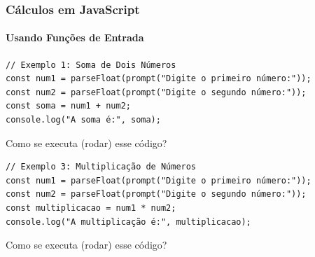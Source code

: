 \documentclass[13pt, xcolor={dvipsnames,svgnames}, portuguese]{beamer}
\begin{document}
\begin{frame}[fragile]
\frametitle{Cálculos em JavaScript}
\framesubtitle{Usando Funções de Entrada}

\begin{verbatim}
// Exemplo 1: Soma de Dois Números
const num1 = parseFloat(prompt("Digite o primeiro número:"));
const num2 = parseFloat(prompt("Digite o segundo número:"));
const soma = num1 + num2;
console.log("A soma é:", soma);
\end{verbatim}
Como se executa (rodar) esse código?
\end{frame}
\begin{frame}[fragile]

\begin{verbatim}
// Exemplo 3: Multiplicação de Números
const num1 = parseFloat(prompt("Digite o primeiro número:"));
const num2 = parseFloat(prompt("Digite o segundo número:"));
const multiplicacao = num1 * num2;
console.log("A multiplicação é:", multiplicacao);
\end{verbatim}
Como se executa (rodar) esse código?
\end{frame}
\end{document}
